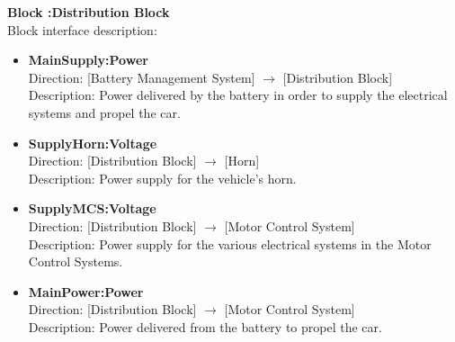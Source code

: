 \textbf{Block :Distribution Block}\\
Block interface description:
\begin{itemize}
	\item \textbf{MainSupply:Power}\\
	Direction: [Battery Management System] $\rightarrow$ [Distribution Block]\\
	Description: Power delivered by the battery in order to supply the electrical systems and propel the car.
	\item \textbf{SupplyHorn:Voltage}\\
	Direction: [Distribution Block] $\rightarrow$ [Horn]\\
	Description: Power supply for the vehicle's horn.
	\item \textbf{SupplyMCS:Voltage}\\
	Direction: [Distribution Block] $\rightarrow$ [Motor Control System]\\
	Description: Power supply for the various electrical systems in the Motor Control Systems.
	\item \textbf{MainPower:Power}\\
	Direction: [Distribution Block] $\rightarrow$ [Motor Control System]\\
	Description: Power delivered from the battery to propel the car.
\end{itemize}

